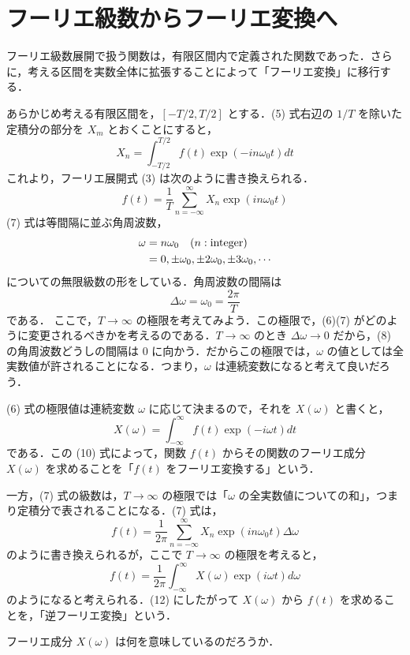 \documentclass[a4paper,10pt]{article}
\newenvironment{questions}{\begin{list}{}{\setlength{\leftmargin}{3em}\setlength{\labelwidth}{2.8em}\setlength{\labelsep}{.2em}\setlength{\itemsep}{0pt}\setlength{\parsep}{0pt}\setlength{\topsep}{10pt}}}{\end{list}}
\newcommand{\q}[1]{\item[{\makebox[2.8em][l]{Q#1}}]}
\begin{document}
\section{フーリエ級数からフーリエ変換へ}
フーリエ級数展開で扱う関数は，有限区間内で定義された関数であった．さらに，考える区間を実数全体に拡張することによって「フーリエ変換」に移行する．

あらかじめ考える有限区間を，$[-T/2,T/2]$ とする．(5) 式右辺の $1/T$ を除いた定積分の部分を $X_m$ とおくことにすると，
\begin{equation}
X_n=\int_{-T/2}^{T/2}f(t)\exp(-in\omega_0t)dt
\end{equation}
\noindent これより，フーリエ展開式 (3) は次のように書き換えられる．
\begin{equation}
f(t)=\frac{1}{T}\sum_{n=-\infty}^{\infty}X_n\exp(in\omega_0t)
\end{equation}
\noindent (7) 式は等間隔に並ぶ角周波数，
\begin{align}
\omega&=n\omega_0\quad(n:\text{integer})\notag\\
&=0,\pm\omega_0,\pm2\omega_0,\pm3\omega_0,\cdots
\end{align}
\noindent についての無限級数の形をしている．角周波数の間隔は
\begin{equation}
\Delta\omega=\omega_0=\frac{2\pi}{T}
\end{equation}
\noindent である．
\newpage
ここで，$T\to\infty$ の極限を考えてみよう．この極限で，(6)(7) がどのように変更されるべきかを考えるのである．$T\to\infty$ のとき $\Delta\omega\to0$ だから，(8) の角周波数どうしの間隔は 0 に向かう．だからこの極限では，$\omega$ の値としては全実数値が許されることになる．つまり，$\omega$ は連続変数になると考えて良いだろう．

(6) 式の極限値は連続変数 $\omega$ に応じて決まるので，それを $X(\omega)$ と書くと，
\begin{equation}
X(\omega)=\int_{-\infty}^{\infty}f(t)\exp(-i\omega t)dt
\end{equation}
\noindent である．この (10) 式によって，関数 $f(t)$ からその関数のフーリエ成分 $X(\omega)$ を求めることを「$f(t)$ をフーリエ変換する」という．

一方，(7) 式の級数は，$T\to\infty$ の極限では「$\omega$ の全実数値についての和」，つまり定積分で表されることになる．(7) 式は，
\begin{equation}
f(t)=\frac{1}{2\pi}\sum_{n=-\infty}^{\infty}X_n\exp(in\omega_0t)\Delta\omega
\end{equation}
\noindent のように書き換えられるが，ここで $T\to\infty$ の極限を考えると，
\begin{equation}
f(t)=\frac{1}{2\pi}\int_{-\infty}^{\infty}X(\omega)\exp(i\omega t)d\omega
\end{equation}
\noindent のようになると考えられる．(12) にしたがって $X(\omega)$ から $f(t)$ を求めることを，「逆フーリエ変換」という．
\begin{questions}
\q{10} フーリエ成分 $X(\omega)$ は何を意味しているのだろうか．
\end{questions}
\end{document}
